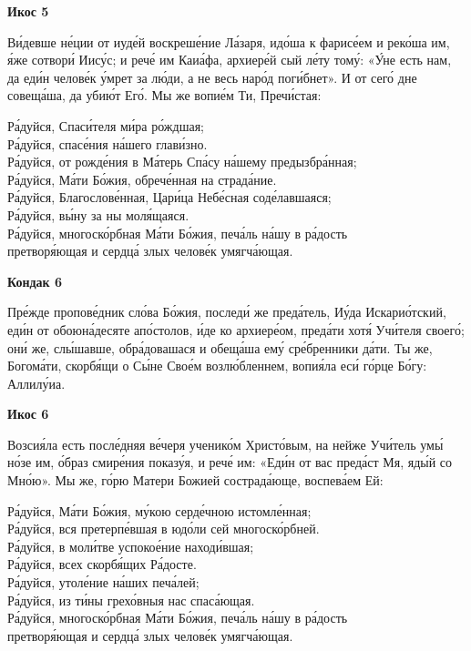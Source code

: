 \documentclass[14pt,article,oneside]{memoir}
\begin{document}
\pagebreak

\begin{center}
  \textbf{Икос 5}
\end{center}

Ви́девше не́ции от иуде́й воскреше́ние Ла́заря, идо́ша к фарисе́ем и реко́ша им, я́же сотвори́ Иису́с; и рече́ им Каиа́фа, архиере́й сый ле́ту тому́: «У́не есть нам, да еди́н челове́к у́мрет за лю́ди, а не весь наро́д поги́бнет». И от сего́ дне совеща́ша, да убию́т Его́. Мы же вопие́м Ти, Пречи́стая:

\noindent Ра́дуйся, Спаси́теля ми́ра ро́ждшая;\\ Ра́дуйся, спасе́ния на́шего глави́зно.\\
Ра́дуйся, от рожде́ния в Ма́терь Спа́су на́шему предызбра́нная;\\ Ра́дуйся, Ма́ти Бо́жия, обрече́нная на страда́ние.\\
Ра́дуйся, Благослове́нная, Цари́ца Небе́сная соде́лавшаяся;\\ Ра́дуйся, вы́ну за ны моля́щаяся.\\
Ра́дуйся, многоско́рбная Ма́ти Бо́жия, печа́ль на́шу в ра́дость\\ \vin претворя́ющая и сердца́ злых челове́к умягча́ющая.

\begin{center}
  \textbf{Кондак 6}
\end{center}

Пре́жде пропове́дник сло́ва Бо́жия, последи́ же преда́тель, Иу́да Искарио́тский, еди́н от обоюна́десяте апо́столов, и́де ко архиере́ом, преда́ти хотя́ Учи́теля своего́; они́ же, слы́шавше, обра́довашася и обеща́ша ему́ сре́бренники да́ти. Ты же, Богома́ти, скорбя́щи о Сы́не Свое́м возлю́бленнем, вопия́ла еси́ го́рце Бо́гу: Аллилу́иа.

\begin{center}
  \textbf{Икос 6}
\end{center}

Возсия́ла есть после́дняя ве́черя ученико́м Христо́вым, на нейже Учи́тель умы́ но́зе им, о́браз смире́ния показу́я, и рече́ им: «Еди́н от вас преда́ст Мя, яды́й со Мно́ю». Мы же, го́рю Матери Божией сострада́юще, воспева́ем Ей:

\noindent Ра́дуйся, Ма́ти Бо́жия, му́кою серде́чною истомле́нная;\\ Ра́дуйся, вся претерпе́вшая в юдо́ли сей многоско́рбней.\\
Ра́дуйся, в моли́тве успокое́ние находи́вшая;\\ Ра́дуйся, всех скорбя́щих Ра́досте.\\
Ра́дуйся, утоле́ние на́ших печа́лей;\\ Ра́дуйся, из ти́ны грехо́вныя нас спаса́ющая.\\
Ра́дуйся, многоско́рбная Ма́ти Бо́жия, печа́ль на́шу в ра́дость\\ \vin претворя́ющая и сердца́ злых челове́к умягча́ющая.
\end{document}
